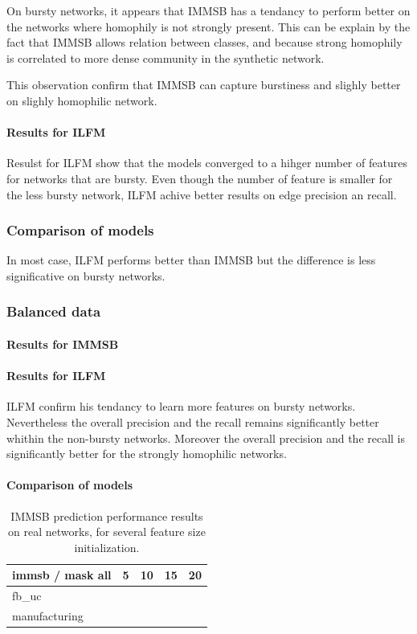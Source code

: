 On bursty networks, it appears that IMMSB has a tendancy to perform better on the networks where homophily is not strongly present. This can be explain by the fact that IMMSB allows relation between classes, and because strong homophily is correlated to more dense community in the synthetic network.


This observation confirm that IMMSB can capture burstiness and slighly better on slighly homophilic network.

\paragraph{Results for ILFM}
Resulst for ILFM show that the models converged to a hihger number of features for networks that are bursty. Even though the number of feature is smaller for the less bursty network, ILFM achive better  results on edge precision an recall.

\subsubsection{Comparison of models}
In most case, ILFM performs better than IMMSB but the difference is less significative on bursty networks.

\subsubsection{Balanced data}
\paragraph{Results for IMMSB}

\paragraph{Results for ILFM}
ILFM confirm his tendancy to learn more features on bursty networks. Nevertheless the overall precision and the recall remains significantly better whithin the non-bursty networks. Moreover the overall precision and the recall is significantly better for the strongly homophilic networks.

\paragraph{Comparison of models}

\begin{table} \label{table:real1}
    \caption{IMMSB prediction performance results on real networks, for several feature size initialization.}
\begin{tabular}{lrrrr}
\hline                                                                             
 immsb / mask all   &        5 &       10 &       15 &       20 \\                 
\hline                                                                             
fb\_uc & & & & \\
manufacturing  & & & & \\
\hline                                                                             
\end{tabular}  
\end{table}


